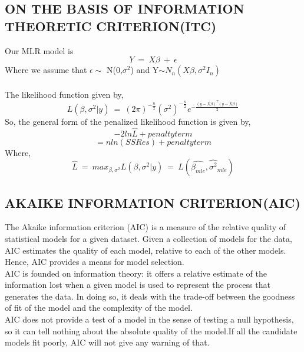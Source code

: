 \documentclass[a4paper,12pt,twoside]{book}
\begin{document}
\subsection*{ON THE BASIS OF INFORMATION THEORETIC CRITERION(ITC)}
Our MLR model is\\
\[Y\:=\:X\beta\:+\:\epsilon\]
Where we assume that $\epsilon \sim$ N(0,$\sigma^2$) and Y$\sim N_n(X\beta,\sigma^2I_n)$\\\\
The likelihood function given by,
\[L(\beta,\sigma^2|y)\:=\:(2\pi)^{-\frac{n}{2}}(\sigma^2)^{-\frac{n}{2}}e^{-\frac{(y-X\beta)^T(y-X\beta)}{2}}\]
So, the general form of the penalized likelihood function is given by,
\[-2ln\hat{L} + penalty term\]
\[= nln(SSRes)+ penalty term\]
Where,
\[\hat{L}\:=\:max_{\beta,\sigma^2}L(\beta,\sigma^2|y)\:=\:L(\hat{\beta_{mle}},\hat{\sigma^2}_{mle})\]
\subsection{AKAIKE INFORMATION CRITERION(AIC)}
The Akaike information criterion (AIC) is a measure of the relative quality of statistical models for a given dataset. Given a collection of models for the data, AIC estimates the quality of each model, relative to each of the other models. Hence, AIC provides a means for model selection.\\
AIC is founded on information theory: it offers a relative estimate of the information lost when a given model is used to represent the process that generates the data. In doing so, it deals with the trade-off between the goodness of fit of the model and the complexity of the model.\\
AIC does not provide a test of a model in the sense of testing a null hypothesis, so it can tell nothing about the absolute quality of the model.If all the candidate models fit poorly, AIC will not give any warning of that.
\end{document}
